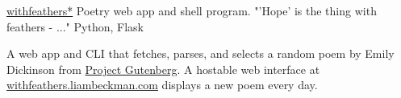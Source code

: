 \showoff
{\textcolor{my-blue}{\href{https://withfeathers.liambeckman.com}{withfeathers*}}}
{Poetry web app and shell program. "'Hope' is the thing with feathers - ..."}
{Python, Flask}
{}

A web app and CLI that fetches, parses, and selects a random poem by Emily Dickinson from \textcolor{my-blue}{\href{https://www.gutenberg.org/ebooks/12242}{Project Gutenberg}}. A hostable web interface at \textcolor{my-blue}{\href{https://withfeathers.liambeckman.com}{withfeathers.liambeckman.com}} displays a new poem every day.

